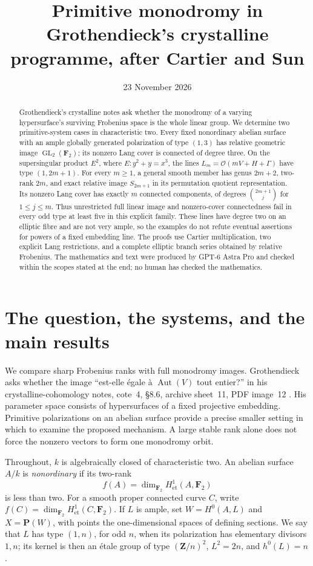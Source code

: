\documentclass[11pt]{article}
\title{Primitive monodromy in Grothendieck's crystalline programme, after Cartier and Sun}
\author{}
\date{23 November 2026}
\theoremstyle{remark}\newtheorem{remark}[theorem]{Remark}
\newcommand{\OO}{\mathcal O}
\newcommand{\FF}{\mathbf F}
\newcommand{\PP}{\mathbf P}
\newcommand{\ZZ}{\mathbf Z}
\newcommand{\et}{\mathrm{et}}
\newcommand{\GL}{\operatorname{GL}}
\begin{document}
\maketitle
\begin{abstract}
Grothendieck's crystalline notes ask whether the monodromy of a varying hypersurface's surviving Frobenius space is the whole linear group. We determine two primitive-system cases in characteristic two. Every fixed nonordinary abelian surface with an ample globally generated polarization of type $(1,3)$ has relative geometric image $\GL_2(\FF_2)$; its nonzero Lang cover is connected of degree three. On the supersingular product $E^2$, where $E:y^2+y=x^3$, the lines $L_m=\OO(mV+H+\Gamma)$ have type $(1,2m+1)$. For every $m\ge1$, a general smooth member has genus $2m+2$, two-rank $2m$, and exact relative image $S_{2m+1}$ in its permutation quotient representation. Its nonzero Lang cover has exactly $m$ connected components, of degrees $\binom{2m+1}{j}$ for $1\le j\le m$. Thus unrestricted full linear image and nonzero-cover connectedness fail in every odd type at least five in this explicit family. These lines have degree two on an elliptic fibre and are not very ample, so the examples do not refute eventual assertions for powers of a fixed embedding line. The proofs use Cartier multiplication, two explicit Lang restrictions, and a complete elliptic branch series obtained by relative Frobenius. The mathematics and text were produced by GPT-6 Astra Pro and checked within the scopes stated at the end; no human has checked the mathematics.
\end{abstract}

\section{The question, the systems, and the main results}\label{sec:intro}

We compare sharp Frobenius ranks with full monodromy images. Grothendieck asks whether the image ``est-elle \'egale \`a $\operatorname{Aut}(V)$ tout entier?'' in his crystalline-cohomology notes, cote~4, \S8.6, archive sheet~11, PDF image~12 \citep{Grothendieck}. His parameter space consists of hypersurfaces of a fixed projective embedding. Primitive polarizations on an abelian surface provide a precise smaller setting in which to examine the proposed mechanism. A large stable rank alone does not force the nonzero vectors to form one monodromy orbit.

Throughout, $k$ is algebraically closed of characteristic two. An abelian surface $A/k$ is \emph{nonordinary} if its two-rank
\[
 f(A)=\dim_{\FF_2}H^1_{\et}(A,\FF_2)
\]
is less than two. For a smooth proper connected curve $C$, write $f(C)=\dim_{\FF_2}H^1_{\et}(C,\FF_2)$. If $L$ is ample, set $W=H^0(A,L)$ and $X=\PP(W)$, with points the one-dimensional spaces of defining sections. We say that $L$ has type $(1,n)$, for odd $n$, when its polarization has elementary divisors $1,n$; its kernel is then an \'etale group of type $(\ZZ/n)^2$, $L^2=2n$, and $h^0(L)=n$.
\end{document}
